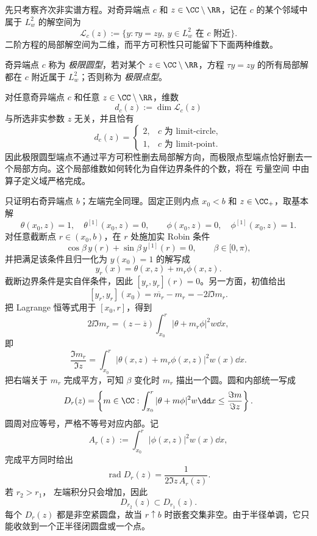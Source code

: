 先只考察齐次非实谱方程。对奇异端点 $c$ 和 $z\in\CC\setminus\RR$，记在 $c$ 的某个邻域中属于 $L^2_w$ 的解空间为
\[
 \mathcal L_c(z):=
 \{y:\tau y=zy,\ y\in L^2_w\text{ 在 }c\text{ 附近}\}.
\]
二阶方程的局部解空间为二维，而平方可积性只可能留下下面两种维数。

\begin{definition}
奇异端点 $c$ 称为 \emph{极限圆型}，若对某个 $z\in\CC\setminus\RR$，方程 $\tau y=zy$ 的所有局部解都在 $c$ 附近属于 $L^2_w$；否则称为 \emph{极限点型}。
\end{definition}

\begin{theorem}\label{thm:math-sl-weyl-alternative}
对任意奇异端点 $c$ 和任意 $z\in\CC\setminus\RR$，维数
\[
 d_c(z):=\dim \mathcal L_c(z)
\]
与所选非实参数 $z$ 无关，并且恰有
\[
 d_c(z)=
 \begin{cases}
 2,&c\text{ 为 limit-circle},\\
 1,&c\text{ 为 limit-point}.
 \end{cases}
\]
因此极限圆型端点不通过平方可积性删去局部解方向，而极限点型端点恰好删去一个局部方向。这个局部维数如何转化为自伴边界条件的个数，将在 亏量空间 中由算子定义域严格完成。
\end{theorem}

只证明右奇异端点 $b$；左端完全同理。固定正则内点 $x_0<b$ 和 $z\in\CC_+$，取基本解
\[
 \theta(x_0,z)=1,\quad \theta^{[1]}(x_0,z)=0,
 \qquad
 \phi(x_0,z)=0,\quad \phi^{[1]}(x_0,z)=1.
\]
对任意截断点 $r\in(x_0,b)$，在 $r$ 处施加实 Robin 条件
\[
 \cos\beta\,y(r)+\sin\beta\,y^{[1]}(r)=0,
 \qquad \beta\in[0,\pi),
\]
并把满足该条件且归一化为 $y(x_0)=1$ 的解写成
\[
 y_r(x)=\theta(x,z)+m_r\phi(x,z).
\]
截断边界条件是实自伴条件，因此 $[y_r,y_r](r)=0$。另一方面，初值给出
\[
 [y_r,y_r](x_0)=\overline{m_r}-m_r=-2\ii\Im m_r.
\]
把 Lagrange 恒等式用于 $[x_0,r]$，得到
\[
 2\ii\Im m_r
 =(z-\overline z)\int_{x_0}^r
 |\theta+m_r\phi|^2w\dd x,
\]
即
\begin{equation*}\frac{\Im m_r}{\Im z}
 =\int_{x_0}^r|\theta(x,z)+m_r\phi(x,z)|^2w(x)\dd x.
\end{equation*}
把右端关于 $m_r$ 完成平方，可知 $\beta$ 变化时 $m_r$ 描出一个圆。圆和内部统一写成
\begin{equation}\label{eq:math-sl-weyl-disk-inequality}
 D_r(z)=\left\{m\in\CC:
 \int_{x_0}^r|\theta+m\phi|^2w\dd x
 \le \frac{\Im m}{\Im z}\right\}.
\end{equation}
圆周对应等号，严格不等号对应内部。记
\[
 A_r(z):=\int_{x_0}^r|\phi(x,z)|^2w(x)\dd x,
\]
完成平方同时给出
\[
 \operatorname{rad}D_r(z)=\frac{1}{2\Im z\,A_r(z)}.
\]
若 $r_2>r_1$， 左端积分只会增加，因此
\[
 D_{r_2}(z)\subset D_{r_1}(z).
\]
每个 $D_r(z)$ 都是非空紧圆盘，故当 $r\uparrow b$ 时嵌套交集非空。由于半径单调，它只能收敛到一个正半径闭圆盘或一个点。

